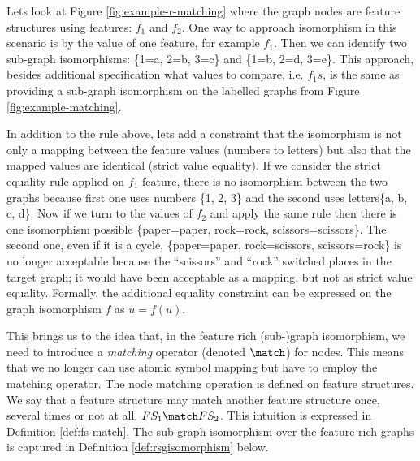     Lets look at Figure \ref{fig:example-r-matching} where the graph nodes are feature structures using features: $f_1$ and $f_2$. One way to approach isomorphism in this scenario is by the value of one feature, for example $f_1$. Then we can identify two sub-graph isomorphisms: \{1=a, 2=b, 3=c\} and \{1=b, 2=d, 3=e\}. This approach, besides additional specification what values to compare, i.e. $f_1s$, is the same as providing a sub-graph isomorphism on the labelled graphs from Figure \ref{fig:example-matching}. 

    In addition to the rule above, lets add a constraint that the isomorphism is not only a mapping between the feature values (numbers to letters) but also that the mapped values are identical (strict value equality). If we consider the strict equality rule applied on $f_1$ feature, there is no isomorphism between the two graphs because first one uses numbers  \{1, 2, 3\} and the second uses letters\{a, b, c, d\}. Now if we turn to the values of $f_2$ and apply the same rule then there is one isomorphism possible \{paper=paper, rock=rock, scissors=scissors\}. The second one, even if it is a cycle, \{paper=paper, rock=scissors, scissors=rock\} is no longer acceptable because the ``scissors'' and ``rock'' switched places in the target graph; it would have been acceptable as a mapping, but not as strict value equality. Formally, the additional equality constraint can be expressed on the graph isomorphism $f$ as $u=f(u)$.

    This brings us to the idea that, in the feature rich (sub-)graph isomorphism, we need to introduce a \textit{matching} operator (denoted $\match$) for nodes. This means that we no longer can use atomic symbol mapping but have to employ the matching operator. The node matching operation is defined on feature structures. We say that a feature structure may match another feature structure once, several times or not at all, $FS_1 \match FS_2$. This intuition is expressed in Definition \ref{def:fs-match}. The sub-graph isomorphism over the feature rich graphs is captured in Definition \ref{def:rsgisomorphism} below.

     


